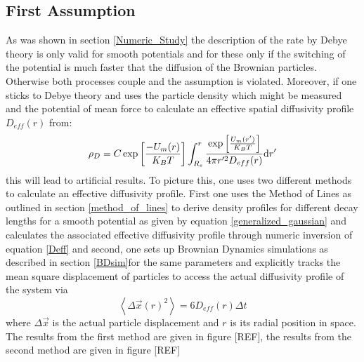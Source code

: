 \subsection{First Assumption}
As was shown in section \ref{Numeric_Study} the description of the rate by Debye theory is only valid for smooth potentials and for these only if the switching of the potential is much faster that the diffusion of the Brownian particles. Otherwise both processes couple and the assumption is violated. Moreover, if one sticks to Debye theory and uses the particle density which might be measured and the potential of mean force to calculate an effective spatial diffusivity profile $D_{eff}(r)$ from: 
\begin{equation}
    \rho_D = C \exp\left[\frac{-U_m(r)}{K_B T}\right] \int_{R_s}^{r} \frac{\exp\left[\frac{U_m(r')}{K_B T}\right]}{4 \pi r'^{2} D_{eff}(r)}{\rm d} r'
    \label{Deff}
\end{equation}
this will lead to artificial results. To picture this, one uses two different methods to calculate an effective diffusivity profile. First one uses the Method of Lines as outlined in section \ref{method_of_lines} to derive density profiles for different decay lengths for a smooth potential as given by equation \eqref{generalized_gaussian} and calculates the associated effective diffusivity profile through numeric inversion of equation \eqref{Deff} and second, one sets up Brownian Dynamics simulations as described in section \ref{BDsim}for the same parameters and explicitly tracks the mean square displacement of particles to access the actual diffusivity profile of the system via
\begin{equation}
    \left<\Delta \vec{x}(r)^{2}\right> = 6 D_{eff}(r) \Delta t
    \label{msqd}
\end{equation}
where $\Delta \vec{x}$ is the actual particle displacement and $r$ is its radial position in space.
The results from the first method are given in figure [REF], the results from the second method are given in figure [REF]

